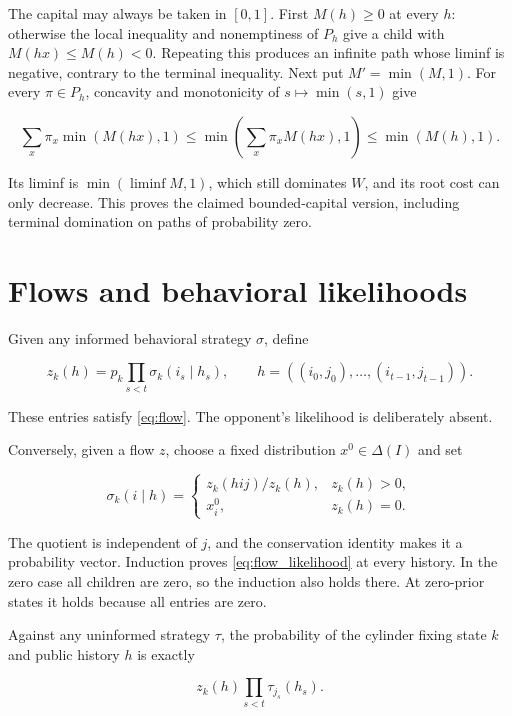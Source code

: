 \documentclass[11pt,a4paper]{article}
\begin{document}
The capital may always be taken in \([0,1]\). First \(M(h)\ge0\) at every \(h\): otherwise the local inequality and nonemptiness of \(P_h\) give a child with \(M(hx)\le M(h)<0\). Repeating this produces an infinite path whose liminf is negative, contrary to the terminal inequality. Next put \(M'=\min(M,1)\). For every \(\pi\in P_h\), concavity and monotonicity of \(s\mapsto\min(s,1)\) give

\[
\sum_x\pi_x\min(M(hx),1)
\le\min\!\left(\sum_x\pi_xM(hx),1\right)
\le\min(M(h),1).
\]

Its liminf is \(\min(\liminf M,1)\), which still dominates \(W\), and its root cost can only decrease. This proves the claimed bounded-capital version, including terminal domination on paths of probability zero.

\section{Flows and behavioral likelihoods}

Given any informed behavioral strategy \(\sigma\), define

\begin{equation}
z_k(h)=p_k\prod_{s<t}\sigma_k(i_s\mid h_s),
\qquad h=((i_0,j_0),\ldots,(i_{t-1},j_{t-1})).
\label{eq:flow_likelihood}
\end{equation}

These entries satisfy \eqref{eq:flow}. The opponent's likelihood is deliberately absent.

Conversely, given a flow \(z\), choose a fixed distribution \(x^0\in\Delta(I)\) and set

\begin{equation}
\sigma_k(i\mid h)=
\begin{cases}
z_k(hij)/z_k(h),&z_k(h)>0,\\
x^0_i,&z_k(h)=0.
\end{cases}
\label{eq:flow_reconstruction}
\end{equation}

The quotient is independent of \(j\), and the conservation identity makes it a probability vector. Induction proves \eqref{eq:flow_likelihood} at every history. In the zero case all children are zero, so the induction also holds there. At zero-prior states it holds because all entries are zero.

Against any uninformed strategy \(\tau\), the probability of the cylinder fixing state \(k\) and public history \(h\) is exactly

\begin{equation}
z_k(h)\prod_{s<t}\tau_{j_s}(h_s). \label{eq:cylinder_law}
\end{equation}
\end{document}
